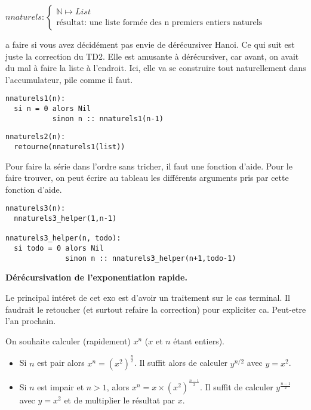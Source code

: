 \documentclass[10pt]{article}\usepackage[correction]{esial}
\begin{document}
\begin{Question}
  $nnaturels: \left\{
    \begin{array}{l}
      \mathbb{N}\mapsto List\\
      \text{résultat: une liste formée des n premiers entiers naturels}
    \end{array}\right.$  
\end{Question}
\begin{Reponse}
   a faire si vous avez décidément
  pas envie de dérécursiver Hanoi. Ce qui suit est juste la correction du
  TD2. Elle est amusante à dérécursiver, car avant, on avait du mal à faire la
  liste à l'endroit. Ici, elle va se construire tout naturellement dans
  l'accumulateur, pile comme il faut.
  
  \begin{Verbatim}[label=Version simple qui donne la liste à l'envers]
nnaturels1(n):
  si n = 0 alors Nil
           sinon n :: nnaturels1(n-1)
  \end{Verbatim}

  \begin{Verbatim}[label=Version trichée qui donne la chaine à l'endroit:]
nnaturels2(n):
  retourne(nnaturels1(list))
  \end{Verbatim}
  
  Pour faire la série dans l'ordre sans tricher, il faut une fonction
  d'aide. Pour le faire trouver, on peut écrire au tableau les différents
  arguments pris par cette fonction d'aide.
  \begin{Verbatim}[label=Version avec helper:]
nnaturels3(n):
  nnaturels3_helper(1,n-1)    

nnaturels3_helper(n, todo):
  si todo = 0 alors Nil
              sinon n :: nnaturels3_helper(n+1,todo-1)
  \end{Verbatim}
\end{Reponse}

\Exercice \textbf{Dérécursivation de l'exponentiation rapide.}

\begin{Reponse}
  Le principal intéret de cet exo est d'avoir un traitement sur le cas
  terminal. Il faudrait le retoucher (et surtout refaire la correction) pour
  expliciter ca. Peut-etre l'an prochain.
\end{Reponse}

On souhaite calculer (rapidement) $x^n$ ($x$ et $n$ étant entiers).
\begin{itemize}
\item Si $n$ est pair alors $x^n=\left(x^2\right)^{\frac{n}{2}}$. Il suffit
  alors de calculer $y^{n/2}$ avec $y=x^2$.
\item Si $n$ est impair et $n>1$, alors
  $x^n=x\times\left(x^2\right)^{\frac{n-1}{2}}$. Il suffit de calculer
  $y^{\frac{n-1}{2}}$ avec $y=x^2$ et de multiplier le résultat par $x$.
\end{itemize}
\end{document}
